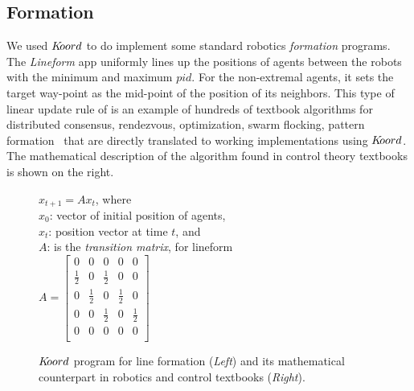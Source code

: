 \subsection{Formation}
\label{sec:formation}
We used $K\kern-2pt oord$ to do implement some standard robotics \emph{formation} programs. The \emph{Lineform} app uniformly lines up the positions of  agents between the robots with the minimum and maximum $pid$. For the non-extremal agents, it sets the target way-point as the mid-point of the position of its neighbors. This type of linear update rule of is an example of hundreds of textbook algorithms for distributed consensus, rendezvous, optimization, swarm flocking, pattern formation~\cite{Tsitsiklis:1986,Blondel,Magnusbook2010} that are directly translated to working implementations using $K\kern-2pt oord$. The mathematical description of the algorithm found in control theory textbooks is shown on the right. 

\begin{figure}[ht!]
	\label{fig:lineform}
	\noindent
	\begin{center}
		\scriptsize
		{}
		{ \vspace{0.1in}
                        $x_{t+1} = Ax_{t}$, where \\
			$x_0$: vector of initial position of agents, \\
			$x_{t}$: position vector at time $t$, and \\
		        $A$: is the \emph{transition matrix}, for lineform  \\
                  
			$A  = \left[ \begin{array}{ccccc}
			0 & 0 & 0 & 0 & 0\\
			\frac{1}{2} & 0 & \frac{1}{2} & 0 & 0\\
			0 & \frac{1}{2} & 0 & \frac{1}{2} & 0  \\
			0 & 0 & \frac{1}{2} & 0 & \frac{1}{2} \\
			0 & 0 & 0 & 0 & 0\\			
			\end{array}\right]$
			}
	\par
        
	\end{center}
	\caption{\small $K\kern-2pt oord$ program for line formation ({\em Left}) and its mathematical counterpart in robotics and control textbooks ({\em Right}).}
\end{figure}

